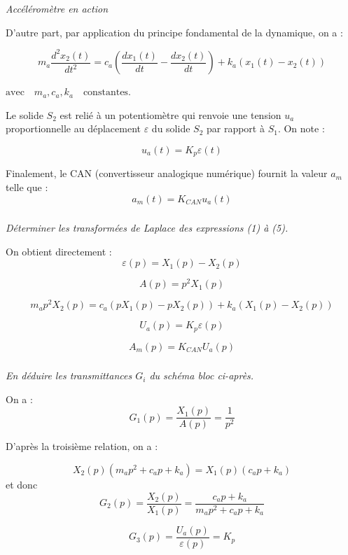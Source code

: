 \documentclass[10pt,fleqn]{article} %
\begin{document}
\begin{multicols}{2}
\begin{center}
\textit{Accéléromètre en action}
\end{center}

D’autre part, par application du principe fondamental de la dynamique, on a :

\begin{equation}
m_a\dfrac{d^2x_2(t)}{dt^2}=c_a\left( \dfrac{dx_1(t)}{dt} - \dfrac{dx_2(t)}{dt}\right)
+k_a\left( x_1(t)-x_2(t)\right) 
\end{equation}

$\mathrm{avec} \quad m_a, c_a, k_a \quad \mathrm{constantes}$.

Le solide $S_2$ est relié à un potentiomètre qui renvoie une tension $u_a$ proportionnelle au déplacement $\varepsilon$ du solide $S_2$ par rapport à $S_1$. On note : 

\begin{equation}
u_a(t)=K_p \varepsilon(t)
\end{equation}

Finalement, le CAN (convertisseur analogique numérique) fournit la valeur $a_m$ telle que :
\begin{equation}
a_m(t) = K_{CAN} u_a (t) 
\end{equation}

\fi

\subparagraph{}
\textit{Déterminer les transformées de Laplace des expressions (1) à (5).}
\ifprof
\begin{corrige}

On obtient directement : 
$$
\varepsilon(p)=X_1(p)-X_2(p)
$$

$$
A(p)=p^2 X_1(p)
$$

$$
m_a p^2 X_2(p)=c_a \left( pX_1(p) - pX_2(p)\right)+k_a\left( X_1(p)
-X_2(p) \right)
$$

$$
U_a(p)=K_p \varepsilon(p)
$$

$$
A_m(p)=K_{CAN} U_a(p)
$$
\end{corrige}
\else
\fi

\subparagraph{}
\textit{En déduire les transmittances $G_i$ du schéma bloc ci-après.}
\ifprof
\begin{corrige}
On a : 
$$
G_1(p) = \dfrac{X_1(p)}{A(p)}=\dfrac{1}{p^2}
$$

D'après la troisième relation, on a :

$$
X_2(p)\left( m_a p^2 +c_a p + k_a \right) = X_1(p) \left( c_a p + k_a  \right)
$$
 et donc 
$$
G_2(p) = \dfrac{X_2(p)}{X_1(p)} = \dfrac{c_a p + k_a}{m_a p^2 +c_a p + k_a}
$$

$$
G_3(p) = \dfrac{U_a(p)}{\varepsilon(p)} = K_p
$$


\end{corrige}
\end{multicols}
\end{document}
